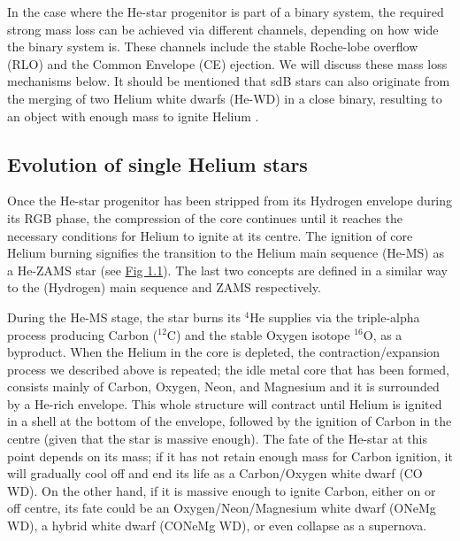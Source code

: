 \documentclass[../../main/thesis_msc.tex]{subfiles}
\begin{document}
				In the case where the He-star progenitor is part of a binary system, the required strong mass loss can be achieved via different channels, depending on how wide the binary system is. These channels include the stable Roche-lobe overflow (RLO) and the Common Envelope (CE) ejection. We will discuss these mass loss mechanisms below.
				It should be mentioned that sdB stars can also originate from the merging of two Helium white dwarfs (He-WD) in a close binary, resulting to an object with enough mass to ignite Helium \citep{Han2002}.
				
				
			
			\subsection{Evolution of single Helium stars}
			
				Once the He-star progenitor has been stripped from its Hydrogen envelope during its RGB phase, the compression of the core continues until it reaches the necessary conditions for Helium to ignite at its centre. The ignition of core Helium burning signifies the transition to the Helium main sequence (He-MS) as a He-ZAMS star (see \hyperref[fig:T_rho_plane_ch1]{Fig 1.1}). The last two concepts are defined in a similar way to the (Hydrogen) main sequence and ZAMS respectively.
				
				During the He-MS stage, the star burns its $^4$He supplies via the triple-alpha process producing Carbon ($^{12}$C) and the stable Oxygen isotope $^{16}$O, as a byproduct. When the Helium in the core is depleted, the contraction/expansion process we described above is repeated; the idle metal core that has been formed, consists mainly of Carbon, Oxygen, Neon, and Magnesium and it is surrounded by a He-rich envelope. This whole structure will contract until Helium is ignited in a shell at the bottom of the envelope, followed by the ignition of Carbon in the centre (given that the star is massive enough). The fate of the He-star at this point depends on its mass; if it has not retain enough mass for Carbon ignition, it will gradually cool off and end its life as a Carbon/Oxygen white dwarf (CO WD). On the other hand, if it is massive enough to ignite Carbon, either on or off centre, its fate could be an Oxygen/Neon/Magnesium white dwarf (ONeMg WD), a hybrid white dwarf (CONeMg WD), or even collapse as a supernova.
				
\end{document}

